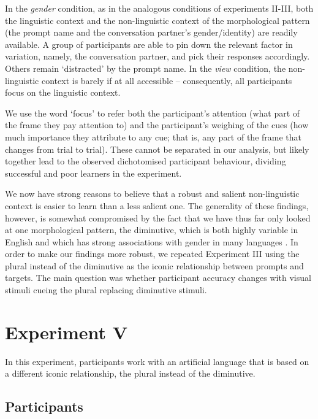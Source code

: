 \documentclass{frontiersSCNS} %
\begin{document}
In the \emph{gender} condition, as in the analogous conditions of experiments II-III, both the linguistic context and the non-linguistic context of the morphological pattern (the prompt name and the conversation partner's gender/identity) are readily available. A group of participants are able to pin down the relevant factor in variation, namely, the conversation partner, and pick their responses accordingly. Others remain `distracted' by the prompt name. In the \emph{view} condition, the non-linguistic context is barely if at all accessible -- consequently, all participants focus on the linguistic context. 


We use the word `focus' to refer both the participant's attention (what part of the frame they pay attention to) and the participant's weighing of the cues (how much importance they attribute to any cue; that is, any part of the frame that changes from trial to trial). These cannot be separated in our analysis, but likely together lead to the observed dichotomised participant behaviour, dividing successful and poor learners in the experiment.


We now have strong reasons to believe that a robust and salient non-linguistic context is easier to learn than a less salient one. The generality of these findings, however, is somewhat compromised by the fact that we have thus far only looked at one morphological pattern, the diminutive, which is both highly variable in English and which has strong associations with gender in many languages \citep{jurafsky2012universals}. In order to make our findings more robust, we repeated Experiment III using the plural instead of the diminutive as the iconic relationship between prompts and targets. The main question was whether participant accuracy changes with visual stimuli cueing the plural replacing diminutive stimuli.

\section{Experiment V}


In this experiment, participants work with an artificial language that is based on a different iconic relationship, the plural instead of the diminutive.


\subsection{Participants}
\end{document}
